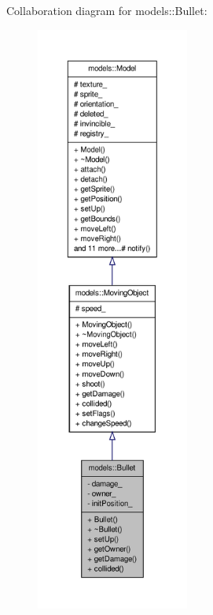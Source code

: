 \-Collaboration diagram for models\-:\-:\-Bullet\-:\nopagebreak
\begin{figure}[H]
\begin{center}
\leavevmode
\includegraphics[height=550pt]{d2/dd1/classmodels_1_1Bullet__coll__graph}
\end{center}
\end{figure}
